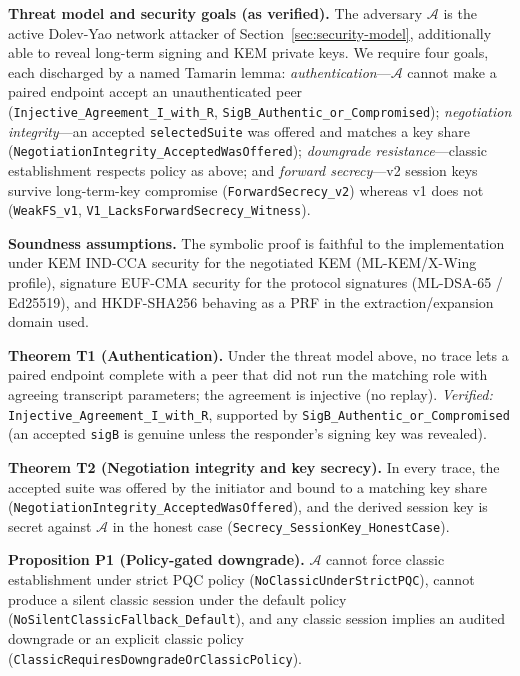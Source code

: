 \documentclass[10pt,journal,compsoc]{IEEEtran}
\begin{document}
\textbf{Threat model and security goals (as verified).} The adversary
$\mathcal{A}$ is the active Dolev-Yao network attacker of
Section~\ref{sec:security-model}, additionally able to reveal long-term
signing and KEM private keys. We require four goals, each discharged by a
named Tamarin lemma: \emph{authentication}---$\mathcal{A}$ cannot make a
paired endpoint accept an unauthenticated peer
(\texttt{Injective\_Agreement\_I\_with\_R},
\texttt{SigB\_Authentic\_or\_Compromised});
\emph{negotiation integrity}---an accepted \texttt{selectedSuite} was
offered and matches a key share
(\texttt{NegotiationIntegrity\_AcceptedWasOffered});
\emph{downgrade resistance}---classic establishment respects policy as
above; and \emph{forward secrecy}---v2 session keys survive long-term-key
compromise (\texttt{ForwardSecrecy\_v2}) whereas v1 does not
(\texttt{WeakFS\_v1}, \texttt{V1\_LacksForwardSecrecy\_Witness}).

\textbf{Soundness assumptions.} The symbolic proof is faithful to the
implementation under KEM IND-CCA security for the negotiated KEM
(ML-KEM/X-Wing profile), signature EUF-CMA security for the protocol
signatures (ML-DSA-65 / Ed25519), and HKDF-SHA256 behaving as a PRF in
the extraction/expansion domain used.

\textbf{Theorem T1 (Authentication).} Under the threat model above, no
trace lets a paired endpoint complete with a peer that did not run the
matching role with agreeing transcript parameters; the agreement is
injective (no replay). \emph{Verified:}
\texttt{Injective\_Agreement\_I\_with\_R}, supported by
\texttt{SigB\_Authentic\_or\_Compromised} (an accepted \texttt{sigB} is
genuine unless the responder's signing key was revealed).

\textbf{Theorem T2 (Negotiation integrity and key secrecy).} In every
trace, the accepted suite was offered by the initiator and bound to a
matching key share (\texttt{NegotiationIntegrity\_AcceptedWasOffered}),
and the derived session key is secret against $\mathcal{A}$ in the honest
case (\texttt{Secrecy\_SessionKey\_HonestCase}).

\textbf{Proposition P1 (Policy-gated downgrade).} $\mathcal{A}$ cannot
force classic establishment under strict PQC policy
(\texttt{NoClassicUnderStrictPQC}), cannot produce a silent classic
session under the default policy
(\texttt{NoSilentClassicFallback\_Default}), and any classic session
implies an audited downgrade or an explicit classic policy
(\texttt{ClassicRequiresDowngradeOrClassicPolicy}).
\end{document}
